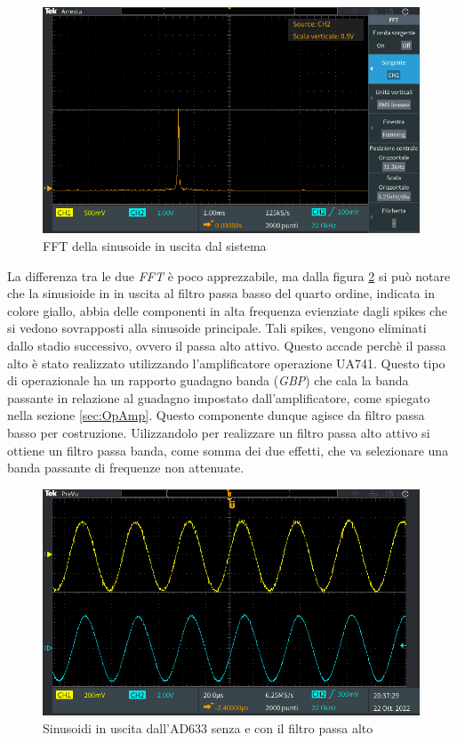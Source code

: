 \documentclass[titlepage]{report}
\begin{document}
	\begin{figure}[H]
		\centering
		\includegraphics[scale = 0.5]{Immagini/ftt_ad633+lp4+hp1_final.PNG}
		\caption{FFT della sinusoide in uscita dal sistema}
		\label{fig:FFTfinale}
	\end{figure}


	 La differenza tra le due \textit{FFT} è poco apprezzabile, ma dalla figura \ref{fig:AD33+LPconsenzaHP} si può notare che la sinusioide in in uscita al filtro passa basso del quarto ordine, indicata in colore giallo, abbia delle componenti in alta frequenza evienziate dagli spikes che si vedono sovrapposti alla sinusoide principale. Tali spikes, vengono eliminati dallo stadio successivo, ovvero il passa alto attivo. Questo accade perchè il passa alto è stato realizzato utilizzando l'amplificatore operazione UA741. Questo tipo di operazionale ha un rapporto guadagno banda (\textit{GBP}) che cala la banda passante in relazione al guadagno impostato dall'amplificatore, come spiegato nella sezione \ref{sec:OpAmp}. Questo componente dunque agisce da filtro passa basso per costruzione. Uilizzandolo per realizzare un filtro passa alto attivo si ottiene un filtro passa banda, come somma dei due effetti, che va selezionare una banda passante di frequenze non attenuate.
	 
	 \begin{figure}[H]
		\centering
		\includegraphics[scale = 0.5]{Immagini/sin_ad633+lp4_ad633+lp4+hp1.PNG}
		\caption{Sinusoidi in uscita dall'AD633 senza e con il filtro passa alto}
		\label{fig:AD33+LPconsenzaHP}
	\end{figure}
\end{document}

